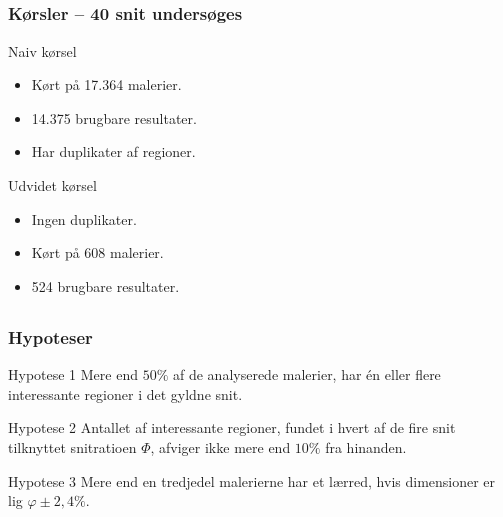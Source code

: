 \documentclass[xcolor=table]{beamer}
\begin{document}
\subsection*{}
\begin{frame}

    \frametitle{Kørsler -- 40 snit undersøges}

    \begin{block}{Naiv kørsel}
        \begin{itemize}
            \item Kørt på 17.364 malerier.
            \item 14.375 brugbare resultater.
            \item \alert{Har duplikater af regioner.}
        \end{itemize}
    \end{block}

    \begin{block}{Udvidet kørsel}
        \begin{itemize}
            \item Ingen duplikater.
            \item Kørt på 608 malerier.
            \item \alert{524 brugbare resultater.}
        \end{itemize}
    \end{block}

\end{frame}

\subsection*{}
\begin{frame}

    \frametitle{Hypoteser}

    \begin{block}{Hypotese 1}
        Mere end \alert{$50\%$} af de analyserede malerier, har én eller flere
        interessante regioner i det gyldne snit.
    \end{block}

    \begin{block}{Hypotese 2}
        Antallet af interessante regioner, fundet i hvert af de fire snit
        tilknyttet snitratioen $\varPhi$, afviger ikke mere end \alert{$10\%$} fra
        hinanden.
    \end{block}

    \begin{block}{Hypotese 3}
        Mere end \alert{en tredjedel} malerierne har et lærred, hvis
        dimensioner er lig $\varphi\pm2,4\%$.
    \end{block}

\end{frame}
\end{document}
